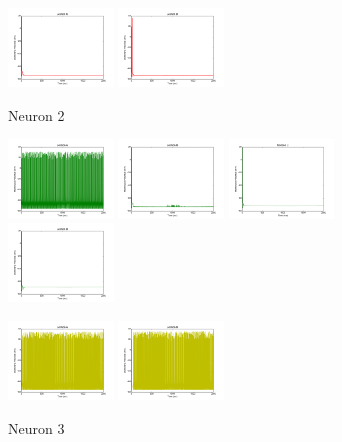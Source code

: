 \documentclass[a4paper,11pt]{article}
\begin{document}
\begin{figure}[H]
\begin{minipage}{0.18\textwidth}
\includegraphics[width = 1.1in]{cstmd_comp6} 
\includegraphics[width = 1.1in]{cstmd_comp7}
\caption* {Neuron 2}
\end{minipage} 
\begin{minipage}{0.18\textwidth}
\includegraphics[width = 1.1in]{cstmd_comp8} 
\includegraphics[width = 1.1in]{cstmd_comp9} 
\includegraphics[width = 1.1in]{cstmd_comp10} 
\includegraphics[width = 1.1in]{cstmd_comp11}
\caption* {Neuron 3}
\end{minipage} 
\begin{minipage}{0.18\textwidth}
\includegraphics[width = 1.1in]{cstmd_comp12} 
\includegraphics[width = 1.1in]{cstmd_comp13} 

\end{minipage}
\end{figure}
\end{document}
